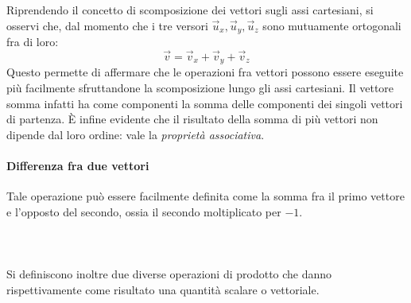 \documentclass[10pt,a4paper]{book}
\begin{document}
Riprendendo il concetto di scomposizione dei vettori sugli assi cartesiani, si osservi che, dal momento che i tre versori $\vec{u}_x, \vec{u}_y, \vec{u}_z$ sono mutuamente ortogonali fra di loro:
\[
	\vec{v}=\vec{v}_x + \vec{v}_y + \vec{v}_z
\]
Questo permette di affermare che le operazioni fra vettori possono essere eseguite più facilmente sfruttandone la scomposizione lungo gli assi cartesiani. Il vettore somma infatti ha come componenti la somma delle componenti dei singoli vettori di partenza.
È infine evidente che il risultato della somma di più vettori non dipende dal loro ordine: vale la \emph{proprietà associativa}.

\paragraph{Differenza fra due vettori} Tale operazione può essere facilmente definita come la somma fra il primo vettore e l'opposto del secondo, ossia il secondo moltiplicato per $-1$.
\\
\\
\\
\\
Si definiscono inoltre due diverse operazioni di prodotto che danno rispettivamente come risultato una quantità scalare o vettoriale.
\end{document}

